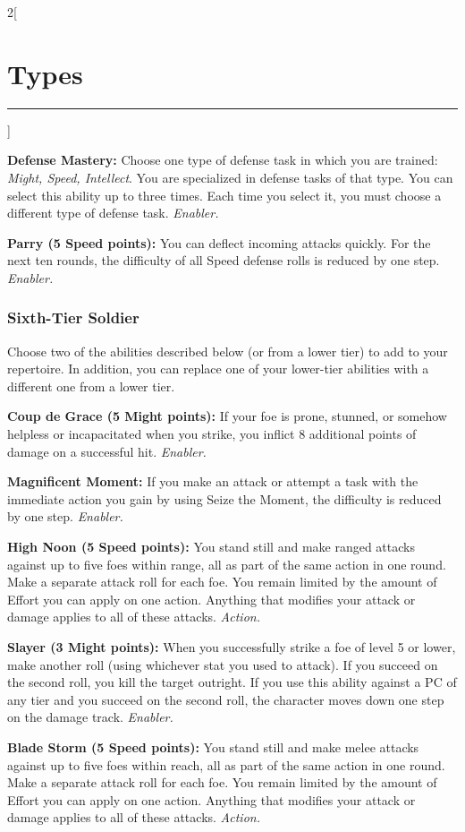 \documentclass[a4paper,10pt,final]{book}
\newcommand{\HRule}{\rule{\linewidth}{0.5mm}} %
\newcommand{\newSection}[1]{\section*{#1} \addcontentsline{toc}{section}{#1} \label{sec:#1} \HRule}
\newcommand{\itemAbility}[2]{\textcolor{25gray}{\textbullet\textbf{ #1:}} {#2}\par}
\newcommand{\enabler}{\textit{ Enabler.}}
\newcommand{\action}{\textit{ Action.}}
\newenvironment{docsection}[1]
{
  \begin{multicols*}{2}[\newSection{#1}]
}
{
  \end{multicols*}
  \newpage
}
\begin{document}
\begin{docsection}{Types}
\itemAbility{Defense Mastery}{Choose one type of defense task in which you are trained: \textit{Might, Speed, Intellect}. You are specialized in defense tasks of that type. You can select this ability up to three times. Each time you select it, you must choose a different type of defense task.\enabler}

\itemAbility{Parry (5 Speed points)}{You can deflect incoming attacks quickly. For the next ten rounds, the difficulty of all Speed defense rolls is reduced by one step.\enabler}


\subsubsection*{Sixth-Tier Soldier}
\label{subsub:soldierSixthTier}

Choose two of the abilities described below (or from a lower tier) to add to your repertoire. In addition, you can replace one of your lower-tier abilities with a different one from a lower tier.

\itemAbility{Coup de Grace (5 Might points)}{If your foe is prone, stunned, or somehow helpless or incapacitated when you strike, you inflict 8 additional points of damage on a successful hit.\enabler}

\itemAbility{Magnificent Moment}{If you make an attack or attempt a task with the immediate action you gain by using Seize the Moment, the difficulty is reduced by one step.\enabler}

\itemAbility{High Noon (5 Speed points)}{You stand still and make ranged attacks against up to five foes within range, all as part of the same action in one round. Make a separate attack roll for each foe. You remain limited by the amount of Effort you can apply on one action. Anything that modifies your attack or damage applies to all of these attacks.\action}

\itemAbility{Slayer (3 Might points)}{When you successfully strike a foe of level 5 or lower, make another roll (using whichever stat you used to attack). If you succeed on the second roll, you kill the target outright. If you use this ability against a PC of any tier and you succeed on the second roll, the character moves down one step on the damage track.\enabler}

\itemAbility{Blade Storm (5 Speed points)}{You stand still and make melee attacks against up to five foes within reach, all as part of the same action in one round. Make a separate attack roll for each foe. You remain limited by the amount of Effort you can apply on one action. Anything that modifies your attack or damage applies to all of these attacks.\action}


\end{docsection}
\end{document}
